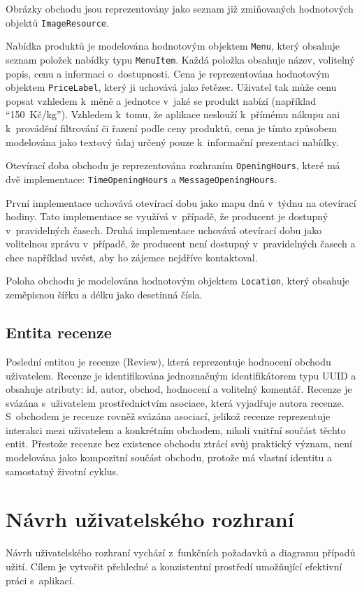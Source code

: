 Obrázky obchodu jsou reprezentovány jako seznam již zmiňovaných hodnotových objektů \texttt{Image\-Resource}.

Nabídka produktů je modelována hodnotovým objektem \texttt{Menu}, který obsahuje seznam položek nabídky typu \texttt{Menu\-Item}.
Každá položka obsahuje název, volitelný popis, cenu a informaci o~dostupnosti.
Cena je reprezentována hodnotovým objektem \texttt{Price\-Label}, který ji uchovává jako řetězec.
Uživatel tak může cenu popsat vzhledem k~měně a jednotce v~jaké se produkt nabízí (například \enquote{150~Kč/kg}).
Vzhledem k~tomu, že aplikace neslouží k~přímému nákupu ani k~provádění filtrování či řazení podle ceny produktů, cena je tímto způsobem modelována jako textový údaj určený pouze k~informační prezentaci nabídky.

Otevírací doba obchodu je reprezentována rozhraním \texttt{Opening\-Hours}, které má dvě implementace: \texttt{Time\-Opening\-Hours} a \texttt{Message\-Opening\-Hours}.

První implementace uchovává otevírací dobu jako mapu dnů v~týd\-nu na otevírací hodiny.
Tato implementace se využívá v~případě, že producent je dostupný v~pravidelných časech.
Druhá implementace uchovává otevírací dobu jako volitelnou zprávu v~případě, že producent není dostupný v~pravidelných časech a chce například uvést, aby ho zájemce nejdříve kontaktoval.

Poloha obchodu je modelována hodnotovým objektem \texttt{Location}, který obsahuje zeměpisnou šířku a délku jako desetinná čísla.

\subsection{Entita recenze}
Poslední entitou je recenze (Review), která reprezentuje hodnocení obchodu uživatelem.
Recenze je identifikována jednoznačným identifikátorem typu UUID a obsahuje atributy: id, autor, obchod, hodnocení a volitelný komentář.
Recenze je svázána s~uživatelem prostřednictvím asociace, která vyjadřuje autora recenze.
S~obchodem je recenze rovněž svázána asociací, jelikož recenze reprezentuje interakci mezi uživatelem a konkrétním obchodem, nikoli vnitřní součást těchto entit.
Přestože recenze bez existence obchodu ztrácí svůj praktický význam, není modelována jako kompozitní součást obchodu, protože má vlastní identitu a samostatný životní cyklus.


\section{Návrh uživatelského rozhraní}
Návrh uživatelského rozhraní vychází z~funkčních požadavků a diagramu případů užití.
Cílem je vytvořit přehledné a konzistentní prostředí umožňující efektivní práci s~aplikací.

